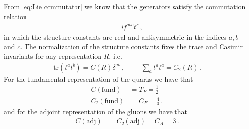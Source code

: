 From \cref{eq:Lie commutator} we know that the generators satisfy the commutation relation
\begin{align}
    [t^{a},t^{b}]=if^{abc}t^{c}\,,
\end{align}
in which the structure constants are real and antisymmetric in the indices $a,b$ and $c$. The normalization of the structure constants fixes the trace and Casimir invariants for any representation $R$, i.e.
\begin{align}
    \text{tr}(t^{a}t^{b})=C(R)\delta^{ab}\,,\hspace{1cm}\sum_{a}t^{a}t^{a}=C_{2}(R)\,.
\end{align}
For the fundamental representation of the quarks we have that
\begin{align}
    C(\text{fund})&=T_{F}=\frac{1}{2}
    \\
    C_{2}(\text{fund})&=C_{F}=\frac{4}{3}\,,
\end{align}
and for the adjoint representation of the gluons we have that
\begin{align}
    C(\text{adj})&=C_{2}(\text{adj})=C_{A}=3\,.
\end{align}

